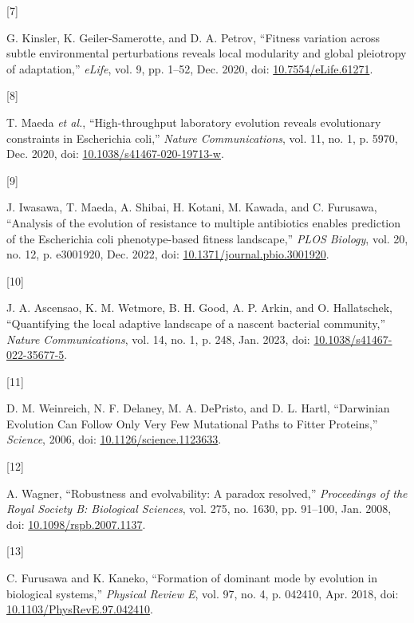 \documentclass[
]{scrartcl}
\newlength{\cslhangindent}
\newlength{\csllabelwidth}
\newenvironment{CSLReferences}[2] %
 {\begin{list}{}{%
  \setlength{\itemindent}{0pt}
  \setlength{\leftmargin}{0pt}
  \setlength{\parsep}{0pt}
  \ifodd #1
   \setlength{\leftmargin}{\cslhangindent}
   \setlength{\itemindent}{-1\cslhangindent}
  \fi
  \setlength{\itemsep}{#2\baselineskip}}}
 {\end{list}}
\newcommand{\CSLLeftMargin}[1]{\parbox[t]{\csllabelwidth}{\strut#1\strut}}
\newcommand{\CSLRightInline}[1]{\parbox[t]{\linewidth - \csllabelwidth}{\strut#1\strut}}
\begin{document}
\begin{CSLReferences}{0}{0}
\CSLLeftMargin{{[}7{]} }%
\CSLRightInline{G. Kinsler, K. Geiler-Samerotte, and D. A. Petrov,
{``Fitness variation across subtle environmental perturbations reveals
local modularity and global pleiotropy of adaptation,''} \emph{eLife},
vol. 9, pp. 1--52, Dec. 2020, doi:
\href{https://doi.org/10.7554/eLife.61271}{10.7554/eLife.61271}.}

\CSLLeftMargin{{[}8{]} }%
\CSLRightInline{T. Maeda \emph{et al.}, {``High-throughput laboratory
evolution reveals evolutionary constraints in {Escherichia} coli,''}
\emph{Nature Communications}, vol. 11, no. 1, p. 5970, Dec. 2020, doi:
\href{https://doi.org/10.1038/s41467-020-19713-w}{10.1038/s41467-020-19713-w}.}

\CSLLeftMargin{{[}9{]} }%
\CSLRightInline{J. Iwasawa, T. Maeda, A. Shibai, H. Kotani, M. Kawada,
and C. Furusawa, {``Analysis of the evolution of resistance to multiple
antibiotics enables prediction of the {Escherichia} coli phenotype-based
fitness landscape,''} \emph{PLOS Biology}, vol. 20, no. 12, p. e3001920,
Dec. 2022, doi:
\href{https://doi.org/10.1371/journal.pbio.3001920}{10.1371/journal.pbio.3001920}.}

\CSLLeftMargin{{[}10{]} }%
\CSLRightInline{J. A. Ascensao, K. M. Wetmore, B. H. Good, A. P. Arkin,
and O. Hallatschek, {``Quantifying the local adaptive landscape of a
nascent bacterial community,''} \emph{Nature Communications}, vol. 14,
no. 1, p. 248, Jan. 2023, doi:
\href{https://doi.org/10.1038/s41467-022-35677-5}{10.1038/s41467-022-35677-5}.}

\CSLLeftMargin{{[}11{]} }%
\CSLRightInline{D. M. Weinreich, N. F. Delaney, M. A. DePristo, and D.
L. Hartl, {``Darwinian {Evolution Can Follow Only Very Few Mutational
Paths} to {Fitter Proteins},''} \emph{Science}, 2006, doi:
\href{https://doi.org/10.1126/science.1123633}{10.1126/science.1123633}.}

\CSLLeftMargin{{[}12{]} }%
\CSLRightInline{A. Wagner, {``Robustness and evolvability: A paradox
resolved,''} \emph{Proceedings of the Royal Society B: Biological
Sciences}, vol. 275, no. 1630, pp. 91--100, Jan. 2008, doi:
\href{https://doi.org/10.1098/rspb.2007.1137}{10.1098/rspb.2007.1137}.}

\CSLLeftMargin{{[}13{]} }%
\CSLRightInline{C. Furusawa and K. Kaneko, {``Formation of dominant mode
by evolution in biological systems,''} \emph{Physical Review E}, vol.
97, no. 4, p. 042410, Apr. 2018, doi:
\href{https://doi.org/10.1103/PhysRevE.97.042410}{10.1103/PhysRevE.97.042410}.}


\end{CSLReferences}
\end{document}
